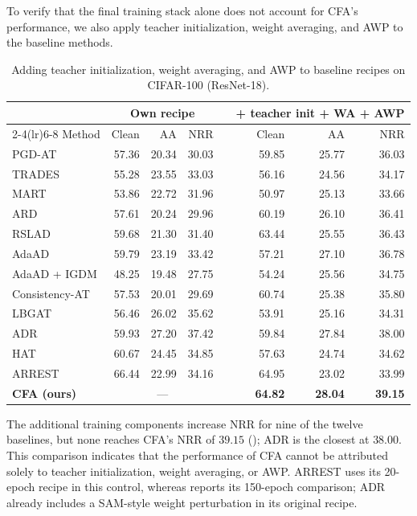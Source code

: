 \documentclass{article} %
\theoremstyle{plain}
\begin{document}
To verify that the final training stack alone does not account for CFA's
performance, we also apply teacher initialization, weight averaging, and AWP
to the baseline methods.

\begin{table}[!htbp]
  \centering
  \scriptsize
  \setlength{\tabcolsep}{4pt}
  \caption{
  Adding teacher initialization, weight averaging, and AWP to baseline
  recipes on CIFAR-100 (ResNet-18).
  }
  \label{tab:baselinestack}
  \begin{tabular}{lrrrcrrr}
    \toprule
    & \multicolumn{3}{c}{Own recipe}
    && \multicolumn{3}{c}{+ teacher init + WA + AWP} \\
    \cmidrule(lr){2-4}\cmidrule(lr){6-8}
    Method & Clean & AA & NRR && Clean & AA & NRR \\
    \midrule
    PGD-AT & 57.36 & 20.34 & 30.03
           && 59.85 & 25.77 & 36.03 \\
    TRADES & 55.28 & 23.55 & 33.03
           && 56.16 & 24.56 & 34.17 \\
    MART & 53.86 & 22.72 & 31.96
         && 50.97 & 25.13 & 33.66 \\
    ARD & 57.61 & 20.24 & 29.96
        && 60.19 & 26.10 & 36.41 \\
    RSLAD & 59.68 & 21.30 & 31.40
          && 63.44 & 25.55 & 36.43 \\
    AdaAD & 59.79 & 23.19 & 33.42
          && 57.21 & 27.10 & 36.78 \\
    AdaAD + IGDM & 48.25 & 19.48 & 27.75
                 && 54.24 & 25.56 & 34.75 \\
    Consistency-AT & 57.53 & 20.01 & 29.69
                   && 60.74 & 25.38 & 35.80 \\
    LBGAT & 56.46 & 26.02 & 35.62
          && 53.91 & 25.16 & 34.31 \\
    ADR & 59.93 & 27.20 & 37.42
        && 59.84 & 27.84 & 38.00 \\
    HAT & 60.67 & 24.45 & 34.85
        && 57.63 & 24.74 & 34.62 \\
    ARREST & 66.44 & 22.99 & 34.16
           && 64.95 & 23.02 & 33.99 \\
    \midrule
    \textbf{CFA (ours)}
      & \multicolumn{3}{c}{---}
      && \textbf{64.82} & \textbf{28.04} & \textbf{39.15} \\
    \bottomrule
  \end{tabular}
\end{table}

The additional training components increase NRR for nine of the twelve
baselines, but none reaches CFA's NRR of \(39.15\)
(); ADR is the closest at \(38.00\).
This comparison indicates that the performance of CFA cannot be attributed
solely to teacher initialization, weight averaging, or AWP.
ARREST uses its 20-epoch recipe in this control, whereas
 reports its 150-epoch comparison; ADR already includes a
SAM-style weight perturbation in its original recipe.
\end{document}
